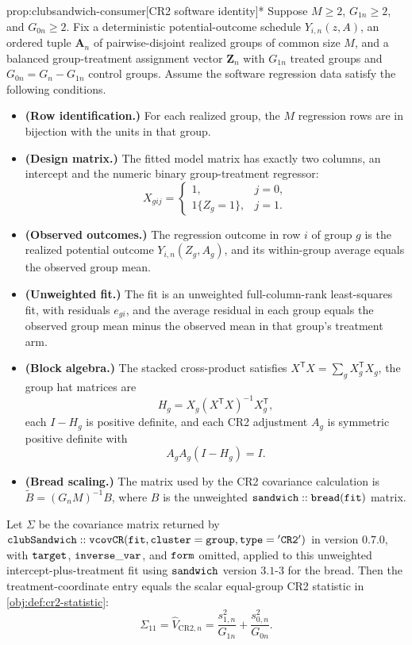 \begin{propositionv}{prop:clubsandwich-consumer}[CR2 software identity]*
Suppose \(M\ge 2\), \(G_{1n}\ge 2\), and \(G_{0n}\ge 2\).  Fix a deterministic potential-outcome schedule \(Y_{i,n}(z,A)\), an ordered tuple \(\mathbf A_n\) of pairwise-disjoint realized groups of common size \(M\), and a balanced group-treatment assignment vector \(\mathbf Z_n\) with \(G_{1n}\) treated groups and \(G_{0n}=G_n-G_{1n}\) control groups.  Assume the software regression data satisfy the following conditions.
\begin{itemize}
\item \textbf{(Row identification.)} For each realized group, the \(M\) regression rows are in bijection with the units in that group.
\item \textbf{(Design matrix.)} The fitted model matrix has exactly two columns, an intercept and the numeric binary group-treatment regressor:
\[
X_{gij}
=
\begin{cases}
1, & j=0,\\
1\{Z_g=1\}, & j=1.
\end{cases}
\]
\item \textbf{(Observed outcomes.)} The regression outcome in row \(i\) of group \(g\) is the realized potential outcome \(Y_{i,n}(Z_g,A_g)\), and its within-group average equals the observed group mean.
\item \textbf{(Unweighted fit.)} The fit is an unweighted full-column-rank least-squares fit, with residuals \(e_{gi}\), and the average residual in each group equals the observed group mean minus the observed mean in that group's treatment arm.
\item \textbf{(Block algebra.)} The stacked cross-product satisfies \(X^{\mathsf T}X=\sum_g X_g^{\mathsf T}X_g\), the group hat matrices are
\[
H_g=X_g(X^{\mathsf T}X)^{-1}X_g^{\mathsf T},
\]
each \(I-H_g\) is positive definite, and each CR2 adjustment \(A_g\) is symmetric positive definite with
\[
A_gA_g(I-H_g)=I.
\]
\item \textbf{(Bread scaling.)} The matrix used by the CR2 covariance calculation is \(\widetilde B=(G_nM)^{-1}B\), where \(B\) is the unweighted \({\tt sandwich::bread}({\tt fit})\) matrix.
\end{itemize}
Let \(\Sigma\) be the covariance matrix returned by \({\tt clubSandwich::vcovCR}({\tt fit}, {\tt cluster}={\tt group}, {\tt type}={\tt 'CR2'})\) in version \(0.7.0\), with \({\tt target}\), \({\tt inverse\_var}\), and \({\tt form}\) omitted, applied to this unweighted intercept-plus-treatment fit using \({\tt sandwich}\) version \(3.1\text{-}3\) for the bread.  Then the treatment-coordinate entry equals the scalar equal-group CR2 statistic in \cref{obj:def:cr2-statistic}:
\[
\Sigma_{11}
=
\widehat V_{\mathrm{CR2},n}
=
\frac{s_{1,n}^2}{G_{1n}}+\frac{s_{0,n}^2}{G_{0n}}.
\]
\end{propositionv}

